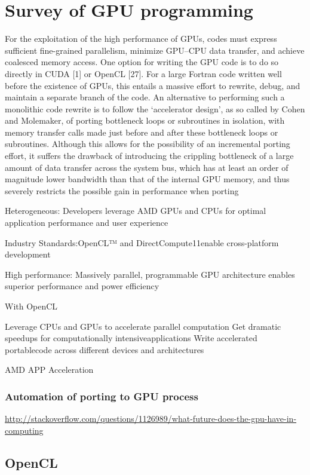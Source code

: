 \chapter{Survey of GPU programming}

For the exploitation of the high performance of GPUs, codes must express sufficient fine-grained parallelism, minimize GPU–CPU data transfer, and achieve coalesced memory access. One option for writing the GPU code is to do so directly in CUDA [1] or OpenCL [27]. For a large Fortran code written well before the existence of GPUs, this entails a massive effort to rewrite, debug, and maintain a separate branch of the code. An alternative to performing such a monolithic code rewrite is to follow the ‘accelerator design’, as so called by Cohen and Molemaker, of porting bottleneck loops or subroutines in isolation, with memory transfer calls made just before and after these bottleneck loops or subroutines. Although this allows for the possibility of an incremental porting effort, it suffers the drawback of introducing the crippling bottleneck of a large amount of data transfer across the system bus, which has at least an order of magnitude lower bandwidth than that of the internal GPU memory, and thus severely restricts the possible gain in performance when porting

Heterogeneous: Developers leverage AMD GPUs and CPUs for optimal application performance and user experience

Industry Standards:OpenCL™ and DirectCompute11enable cross-platform development

High performance: Massively parallel, programmable GPU architecture enables superior performance and power efficiency

With OpenCL

Leverage CPUs and GPUs to accelerate parallel computation
Get dramatic speedups for computationally intensiveapplications
Write accelerated portablecode across different devices and architectures


AMD APP Acceleration 


\subsection{Automation of porting to GPU process}

\hyperref[AMD]{http://stackoverflow.com/questions/1126989/what-future-does-the-gpu-have-in-computing}


\section{OpenCL}

